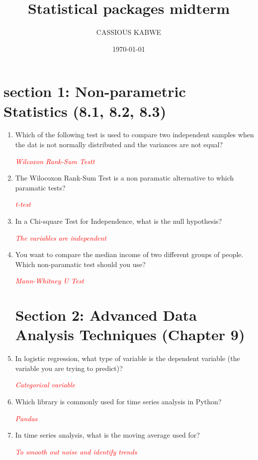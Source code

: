 \documentclass{article}
\author{CASSIOUS KABWE}
\title{Statistical packages midterm}
\date{\today}
\begin{document}
\maketitle

\section{section 1:  Non-parametric Statistics (8.1, 8.2, 8.3)}
\begin{enumerate}
	\item Which of the following test is used to compare two independent samples when the dat is not normally distributed and the variances are not equal? \par 
    \textcolor{red}{\textit{Wilcoxon Rank-Sum Testt}}
        

    \item The Wilocoxon Rank-Sum Test is a non paramatic alternative to which paramatic tests? \par 
        \textcolor{red}{\textit{t-test}}
    
    \item In a Chi-square Test for Independence, what is the null hypothesis? \par 
        \textcolor{red}{\textit{The variables are independent}}

    \item You want to compare the median income of two different groups of people. Which non-paramatic test should you use? \par
        \textcolor{red}{\textit{Mann-Whitney U Test}}

    \section{Section 2: Advanced Data Analysis Techniques (Chapter 9)}

    \item In logistic regression, what type of variable is the dependent variable (the variable you are trying to predict)? \par
    \textcolor{red}{\textit{Categorical variable}}

    \item Which library is commonly used for time series analysis in Python? \par
    \textcolor{red}{\textit{Pandas}}
    

    \item In time series analysis, what is the moving average used for? \par
    \textcolor{red}{\textit{To smooth out noise and identify trends}}


\end{enumerate}
\end{document}
